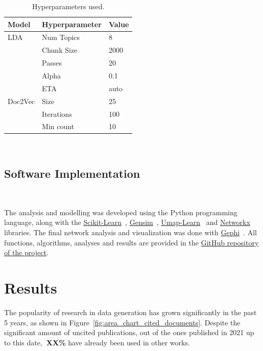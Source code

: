 \documentclass[parskip=full]{scrartcl}
\begin{document}
\begin{table}[H]
    \centering
    \begin{tabular}{lll}
        \toprule
        Model   &   Hyperparameter  &   Value \\
        \midrule
        LDA     &   Num Topics      &   8     \\
                &   Chunk Size      &   2000  \\
                &   Passes          &   20    \\
                &   Alpha           &   0.1   \\
                &   ETA             &   auto  \\
        \midrule
        Doc2Vec &   Size            &   25    \\
                &   Iterations      &   100   \\
                &   Min count       &   10    \\
        \bottomrule
    \end{tabular}
    \caption{Hyperparameters used.}~\label{tab:hyperparameters}
\end{table}

\subsection{Software Implementation}~\label{sec:software_implementation}

The analysis and modelling was developed using the Python programming
language, along with the
\href{https://scikit-learn.org/stable/}{Scikit-Learn}~\cite{Pedregosa2011},
\href{https://radimrehurek.com/gensim/}{Gensim}~\cite{Rehurek2010},
\href{https://github.com/lmcinnes/umap}{Umap-Learn}~\cite{Mcinnes2018} and
\href{https://networkx.org/}{Networkx}~\cite{Hagberg2008} libraries. The final
network analysis and visualization was done with
\href{https://gephi.org/}{Gephi}~\cite{Bastian2009}. All functions,
algorithms, analyses and results are provided in the
\href{https://github.com/joaopfonseca/research}{GitHub repository of the
project}.

\section{Results}

The popularity of research in data generation has grown significantly in the
past 5 years, as shown in Figure~\ref{fig:area_chart_cited_documents}. Despite
the significant amount of uncited publications, out of the ones published in
2021 up to this date,\textbf{\ XX\%} have already been used in other works.
\end{document}
